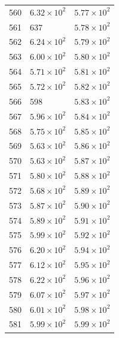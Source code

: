 \begin{table}[H]
\begin{tabular}{lll}
560 & $\displaystyle 6.32 \times 10^{2}$ & $\displaystyle 5.77 \times 10^{2}$ \\
561 & 637 & $\displaystyle 5.78 \times 10^{2}$ \\
562 & $\displaystyle 6.24 \times 10^{2}$ & $\displaystyle 5.79 \times 10^{2}$ \\
563 & $\displaystyle 6.00 \times 10^{2}$ & $\displaystyle 5.80 \times 10^{2}$ \\
564 & $\displaystyle 5.71 \times 10^{2}$ & $\displaystyle 5.81 \times 10^{2}$ \\
565 & $\displaystyle 5.72 \times 10^{2}$ & $\displaystyle 5.82 \times 10^{2}$ \\
566 & 598 & $\displaystyle 5.83 \times 10^{2}$ \\
567 & $\displaystyle 5.96 \times 10^{2}$ & $\displaystyle 5.84 \times 10^{2}$ \\
568 & $\displaystyle 5.75 \times 10^{2}$ & $\displaystyle 5.85 \times 10^{2}$ \\
569 & $\displaystyle 5.63 \times 10^{2}$ & $\displaystyle 5.86 \times 10^{2}$ \\
570 & $\displaystyle 5.63 \times 10^{2}$ & $\displaystyle 5.87 \times 10^{2}$ \\
571 & $\displaystyle 5.80 \times 10^{2}$ & $\displaystyle 5.88 \times 10^{2}$ \\
572 & $\displaystyle 5.68 \times 10^{2}$ & $\displaystyle 5.89 \times 10^{2}$ \\
573 & $\displaystyle 5.87 \times 10^{2}$ & $\displaystyle 5.90 \times 10^{2}$ \\
574 & $\displaystyle 5.89 \times 10^{2}$ & $\displaystyle 5.91 \times 10^{2}$ \\
575 & $\displaystyle 5.99 \times 10^{2}$ & $\displaystyle 5.92 \times 10^{2}$ \\
576 & $\displaystyle 6.20 \times 10^{2}$ & $\displaystyle 5.94 \times 10^{2}$ \\
577 & $\displaystyle 6.12 \times 10^{2}$ & $\displaystyle 5.95 \times 10^{2}$ \\
578 & $\displaystyle 6.22 \times 10^{2}$ & $\displaystyle 5.96 \times 10^{2}$ \\
579 & $\displaystyle 6.07 \times 10^{2}$ & $\displaystyle 5.97 \times 10^{2}$ \\
580 & $\displaystyle 6.01 \times 10^{2}$ & $\displaystyle 5.98 \times 10^{2}$ \\
581 & $\displaystyle 5.99 \times 10^{2}$ & $\displaystyle 5.99 \times 10^{2}$ \\

\end{tabular}
\end{table}
